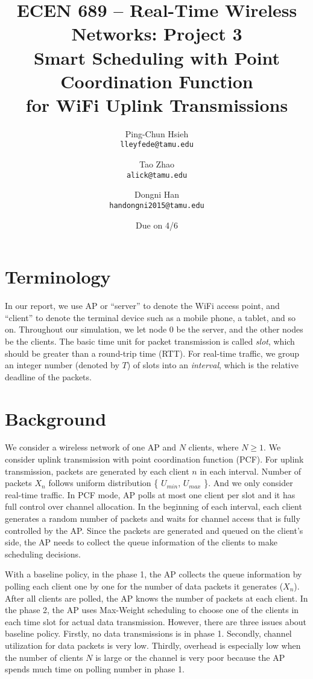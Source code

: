 \documentclass{article}
\begin{document}
\title{\bfseries ECEN 689 -- Real-Time Wireless Networks: Project 3\\
Smart Scheduling with Point Coordination Function\\
 for WiFi Uplink Transmissions}
\date{Due on 4/6}
\author{%
Ping-Chun Hsieh\\
\texttt{lleyfede@tamu.edu}
\and
Tao Zhao\\
\texttt{alick@tamu.edu}
\and
Dongni Han\\
\texttt{handongni2015@tamu.edu}
}
\maketitle

\section*{Terminology}

In our report, we use AP or ``server'' to denote the WiFi access point, and ``client'' to denote the terminal device such as a mobile phone, a tablet, and so on. Throughout our simulation, we let node $0$ be the server, and the other nodes be the clients. The basic time unit for packet transmission is called \emph{slot}, which should be greater than a round-trip time (RTT). For real-time traffic, we group an integer number (denoted by $T$) of slots into an \emph{interval}, which is the relative deadline of the packets.

\section{Background}

We consider a wireless network of one AP and $N$ clients, where $N\ge1$. We consider uplink transmission with point coordination function (PCF). For uplink transmission, packets are generated by each client $n$ in each interval. Number of packets $X_n$ follows uniform distribution \{ $U_{min}$, $U_{max}$ \}. And we only consider real-time traffic. In PCF mode, AP polls at most one client per slot and it has full control over channel allocation. In the beginning of each interval, each client generates a random number of packets and waits for channel access that is fully controlled by the AP. Since the packets are generated and queued on the client's side, the AP needs to collect the queue information of the clients to make scheduling decisions.

With a baseline policy, in the phase 1,  the AP collects the queue information by polling each client one by one for the number of data packets it generates ($X_n$). After all clients are polled, the AP knows the number of packets at each client. In the phase 2, the AP uses Max-Weight scheduling to choose one of the clients in each time slot for actual data transmission. However, there are three issues about baseline policy. Firstly, no data transmissions is in phase 1. Secondly, channel utilization for data packets is very low. Thirdly, overhead is especially low when the number of clients $N$ is large or the channel is very poor because the AP spends much time on polling number in phase 1. 
\end{document}
